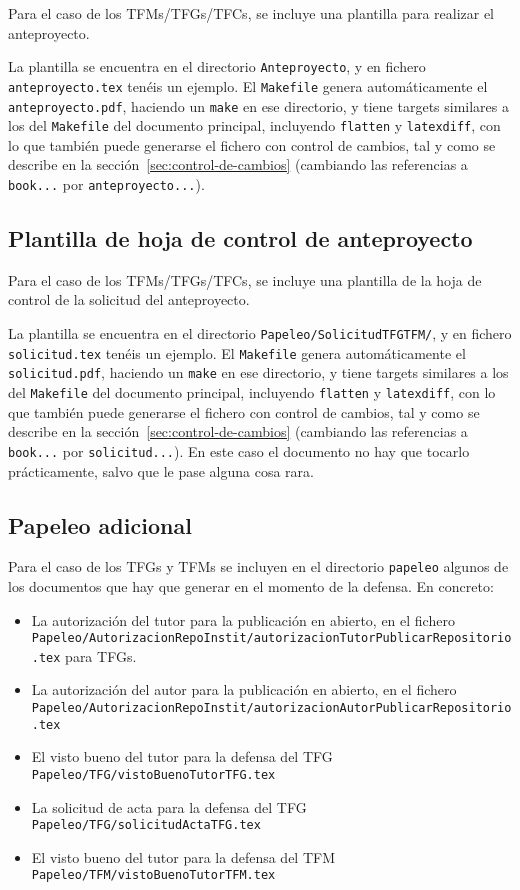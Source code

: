 Para el caso de los TFMs/TFGs/TFCs, se incluye una plantilla para realizar el anteproyecto.

La plantilla se encuentra en el directorio \texttt{Anteproyecto}, y en fichero \texttt{anteproyecto.tex} tenéis un ejemplo. El \texttt{Makefile} genera automáticamente el \texttt{anteproyecto.pdf}, haciendo un \texttt{make} en ese directorio, y tiene targets similares a los del \texttt{Makefile} del documento principal, incluyendo \texttt{flatten} y \texttt{latexdiff}, con lo que también puede generarse el fichero con control de cambios, tal y como se describe en la sección~\ref{sec:control-de-cambios} (cambiando las referencias a \texttt{book...} por \texttt{anteproyecto...}).

\subsection{Plantilla de hoja de control de anteproyecto}
\label{sec:plantilla-de-hoja-control-anteproyecto}

Para el caso de los TFMs/TFGs/TFCs, se incluye una plantilla de la hoja de control de la solicitud del anteproyecto.

La plantilla se encuentra en el directorio \texttt{Papeleo/SolicitudTFGTFM/}, y en fichero \texttt{solicitud.tex} tenéis un ejemplo. El \texttt{Makefile} genera automáticamente el \texttt{solicitud.pdf}, haciendo un \texttt{make} en ese directorio, y tiene targets similares a los del \texttt{Makefile} del documento principal, incluyendo \texttt{flatten} y \texttt{latexdiff}, con lo que también puede generarse el fichero con control de cambios, tal y como se describe en la sección~\ref{sec:control-de-cambios} (cambiando las referencias a \texttt{book...} por \texttt{solicitud...}). En este caso el documento no hay que tocarlo prácticamente, salvo que le pase alguna cosa rara.


\subsection{Papeleo adicional}
\label{sec:introapp1}

Para el caso de los TFGs y TFMs se incluyen en el directorio \texttt{papeleo} algunos de los documentos que hay que generar en el momento de la defensa. En concreto:

\begin{itemize}
  \item La autorización del tutor para la publicación en abierto, en el fichero \texttt{Papeleo/AutorizacionRepoInstit/autorizacionTutorPublicarRepositorio.tex} para TFGs.
  \item La autorización del autor para la publicación en abierto, en el fichero \texttt{Papeleo/AutorizacionRepoInstit/autorizacionAutorPublicarRepositorio.tex}
  \item El visto bueno del tutor para la defensa del TFG \texttt{Papeleo/TFG/vistoBuenoTutorTFG.tex}
  \item La solicitud de acta para la defensa del TFG \texttt{Papeleo/TFG/solicitudActaTFG.tex}
  \item El visto bueno del tutor para la defensa del TFM \texttt{Papeleo/TFM/vistoBuenoTutorTFM.tex}
\end{itemize}

